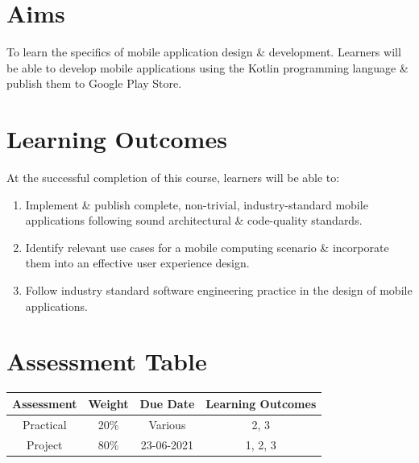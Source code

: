 \documentclass{article}
\begin{document}
\section*{Aims}
To learn the specifics of mobile application design \& development. Learners will be able to develop mobile applications using the Kotlin programming language \& publish them to Google Play Store.

\section*{Learning Outcomes}
At the successful completion of this course, learners will be able to: 
\begin{enumerate}
	\item Implement \& publish complete, non-trivial, industry-standard mobile applications following sound architectural \& code-quality standards.
	\item Identify relevant use cases for a mobile computing scenario \& incorporate them into an effective user experience design.
	\item Follow industry standard software engineering practice in the design of mobile applications.
\end{enumerate} 

\section*{Assessment Table}
\renewcommand{\arraystretch}{1.5}	
\begin{tabular}{|c|c|c|c|}
	\hline
	\textbf{Assessment} & \textbf{Weight} & \textbf{Due Date} & \textbf{Learning Outcomes} \\ \hline
	Practical           & 20\%            & Various           & 2, 3                       \\ \hline
	Project             & 80\%            & 23-06-2021        & 1, 2, 3                    \\ \hline
\end{tabular} 
\end{document}

